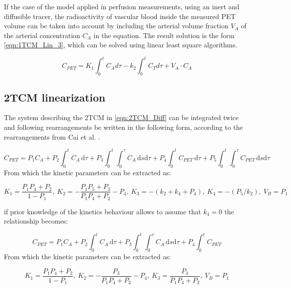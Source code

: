 If the case of the model applied in perfusion measurements, using an inert and diffusible tracer, the radioactivity of vascular blood inside the measured PET volume can be taken into account by including the arterial volume fraction  $V_A$ of the arterial concentration $C_A$ in the equation. The result solution is the form \ref{eqn:1TCM_Lin_3}, which can be solved using linear least square algorithms.

\begin{equation}
C_{PET} = K_1 \int_{0}^{t} C_A d\tau - k_2 \int_{0}^{t} C_T d\tau + V_A \cdot C_A
\label{eqn:1TCM_Lin_3}
\end{equation}

\subsection{2TCM linearization}
The system describing the 2TCM in \ref{eqn:2TCM_Diff} can be integrated twice and following rearrangements be written in the following form, according to the rearrangements from Cai et al. \cite{Cai2002}.   

\begin{equation} \label{microLinearization_with_k4}
C_{PET} = P_1 C_A + P_2 \int_0^t \! C_A \, \mathrm{d}\tau + P_3 \int_0^t \int_0^\tau \! C_A \,\mathrm{d}s \mathrm{d}\tau
+ P_4 \int_0^t \! C_{PET} \, \mathrm{d}\tau + P_5 \int_0^t \int_0^\tau \! C_{PET} \,\mathrm{d}s \mathrm{d}\tau
\end{equation}
\newline From which the kinetic parameters can be extracted as: 

\begin{equation} \label{ParamsLinearization_with_k4}
K_1=\frac{P_1 P_4 + P_2}{1-P_1} ,\  K_2=- \frac{P_1 P_5 + P_3}{P_1 P_4 + P_2} - P_4 ,\ K_3=-(k_2 + k_4 + P_4) 
,\ K_4=-(P_5/k_2) ,\  V_B = P_1 
\end{equation}


if prior knowledge of the kinetics behaviour allows to assume that $k_{4} = 0 $ the relationship becomes: 

\begin{equation} \label{microLinearization_no_k4}
C_{PET} = P_1 C_A + P_2 \int_0^t \! C_A \, \mathrm{d}\tau + P_3 \int_0^t \int_0^\tau \! C_A \,\mathrm{d}s \mathrm{d}\tau
+ P_4 \int_0^t \! C_{PET} 
\end{equation}
 From which the kinetic parameters can be extracted as: 

\begin{equation} \label{ParamsLinearization_no_k4}
K_1=\frac{P_1 P_4 + P_2}{1-P_1} ,\  K_2=- \frac{P_3}{P_1 P_4 + P_2} - P_4 ,\ K_3=\frac{P_3}{P_1 P_4 + P_2} ,\  V_B = P_1
\end{equation}

